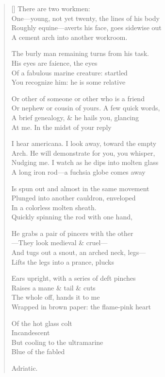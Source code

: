\label{ch:murano}
\settowidth{\versewidth}{Roughly equine—averts his face, goes sidewise out}
\begin{verse}[\versewidth]
There are two workmen:\\
One---young, not yet twenty, the lines of his body\\
Roughly equine---averts his face, goes sidewise out\\
A cement arch into another workroom.

The burly man remaining turns from his task.\\
His eyes are faience, the eyes\\
Of a fabulous marine creature: startled\\
You recognize him: he is some relative

Or other of someone or other who is a friend\\
Or nephew or cousin of yours. A few quick words,\\
A brief genealogy, \& he hails you, glancing\\
At me. In the midst of your reply

I hear americana. I look away, toward the empty\\
Arch. He will demonstrate for you, you whisper,\\
Nudging me. I watch as he dips into molten glass\\
A long iron rod---a fuchsia globe comes away

Is spun out and almost in the same movement\\
Plunged into another cauldron, enveloped\\
In a colorless molten sheath.\\
Quickly spinning the rod with one hand,

He grabs a pair of pincers with the other\\
---They look medieval \& cruel---\\
And tugs out a snout, an arched neck, legs---\\
Lifts the legs into a prance, plucks

Ears upright, with a series of deft pinches\\
Raises a mane \& tail \& cuts\\
The whole off, hands it to me\\
Wrapped in brown paper: the flame-pink heart

Of the hot glass colt\\
Incandescent\\
But cooling to the ultramarine\\
Blue of the fabled

Adriatic.
\end{verse}
